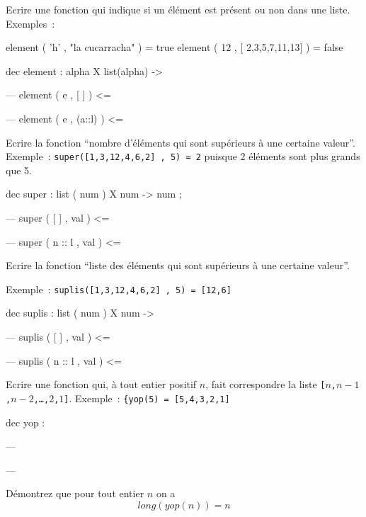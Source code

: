 \begin{exercice}
 Ecrire une fonction qui indique si un élément est présent ou non dans une liste. Exemples~:
\begin{verbatimtab}
element (  'h' , "la cucarracha" ) = true
element ( 12 , [ 2,3,5,7,11,13] ) = false

dec element :  alpha X list(alpha) ->

--- element ( e , [ ] )         <=

--- element ( e , (a::l) )      <=  


\end{verbatimtab}
\end{exercice}
\begin{exercice}
 Ecrire la fonction ``nombre d'éléments qui sont supérieurs à une
 certaine valeur''.
Exemple~: \verb+super([1,3,12,4,6,2] , 5) = 2+	puisque 2 éléments sont 
plus grands que 5.
\begin{verbatimtab}
dec super : list ( num ) X num  -> num ; 

--- super ( [ ]     , val )     <=

--- super ( n :: l , val )      <= 		


\end{verbatimtab}
\end{exercice}

\begin{exercice}
Ecrire la fonction ``liste des éléments qui sont supérieurs à une certaine valeur''.

Exemple~: \verb+suplis([1,3,12,4,6,2] , 5) = [12,6]+
\begin{verbatimtab}
dec suplis : list ( num ) X num  -> 

--- suplis ( [ ]     , val ) 	<=

--- suplis ( n :: l , val )	<= 		

\end{verbatimtab}
\end{exercice}

\begin{exercice}

Ecrire une fonction qui, à tout entier positif $n$, fait correspondre la liste \texttt{[$n$,$n-1$,$n-2$,\ldots,$2$,$1$]}.
Exemple~: \verb+{yop(5) = [5,4,3,2,1]+
\begin{verbatimtab}
dec yop : 

---

---

\end{verbatimtab}
\end{exercice}
\begin{exercice}
Démontrez que pour tout entier $n$ on a 	
$$long(yop(n)) = n$$  
\end{exercice}


